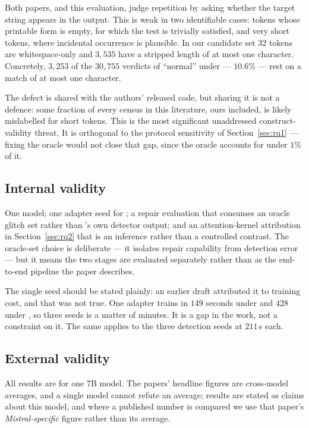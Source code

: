 Both papers, and this evaluation, judge repetition by asking whether the target
string appears in the output. This is weak in two identifiable cases: tokens
whose printable form is empty, for which the test is trivially satisfied, and
very short tokens, where incidental occurrence is plausible. In our candidate set
$32$ tokens are whitespace-only and $3{,}535$ have a stripped length of at most
one character. Concretely, $3{,}253$ of the $30{,}755$ verdicts of ``normal''
under \Ppaper{} --- $10.6\%$ --- rest on a match of at most one character.

The defect is shared with the authors' released code, but sharing it is not a
defence: some fraction of every census in this literature, ours included, is
likely mislabelled for short tokens. This is the most significant unaddressed
construct-validity threat. It is orthogonal to the protocol sensitivity of
Section~\ref{sec:rq1} --- fixing the oracle would not close that gap, since the
oracle accounts for under $1\%$ of it.

\subsection{Internal validity}

One model; one adapter seed for \gc{}; a repair evaluation that consumes an
oracle glitch set rather than \gp{}'s own detector output; and an
attention-kernel attribution in Section~\ref{sec:rq2} that is an inference rather
than a controlled contrast. The oracle-set choice is deliberate --- it isolates
repair capability from detection error --- but it means the two stages are
evaluated separately rather than as the end-to-end pipeline the paper describes.

The single \gc{} seed should be stated plainly: an earlier draft attributed it to
training cost, and that was not true. One adapter trains in $149$ seconds under
\Ppaper{} and $428$ under \Pcode{}, so three seeds is a matter of minutes. It is
a gap in the work, not a constraint on it. The same applies to the three
detection seeds at $211$\,s each.

\subsection{External validity}

All results are for one 7B model. The papers' headline figures are cross-model
averages, and a single model cannot refute an average; results are stated as
claims about this model, and where a published number is compared we use that
paper's \emph{Mistral-specific} figure rather than its average.

